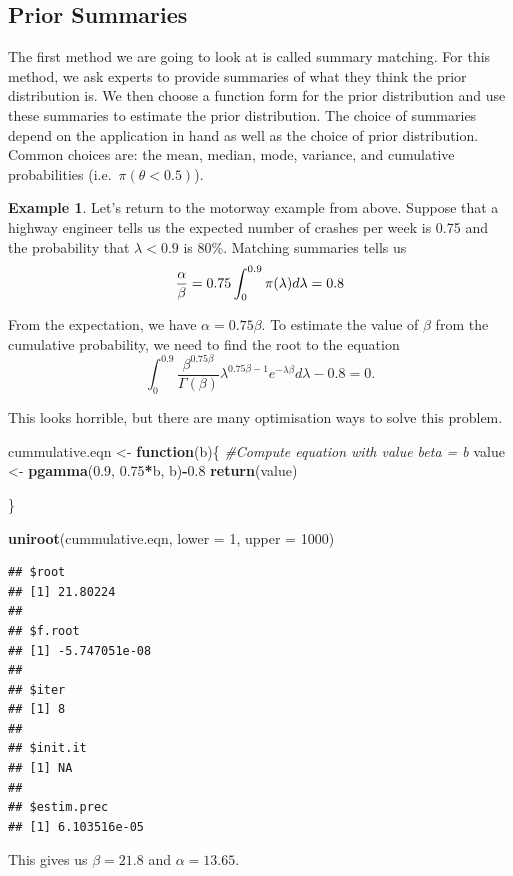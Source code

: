 \documentclass[
]{book}
\newenvironment{Shaded}{\begin{snugshade}}{\end{snugshade}}
\newcommand{\AttributeTok}[1]{\textcolor[rgb]{0.13,0.29,0.53}{#1}}
\newcommand{\CommentTok}[1]{\textcolor[rgb]{0.56,0.35,0.01}{\textit{#1}}}
\newcommand{\ControlFlowTok}[1]{\textcolor[rgb]{0.13,0.29,0.53}{\textbf{#1}}}
\newcommand{\DecValTok}[1]{\textcolor[rgb]{0.00,0.00,0.81}{#1}}
\newcommand{\FloatTok}[1]{\textcolor[rgb]{0.00,0.00,0.81}{#1}}
\newcommand{\FunctionTok}[1]{\textcolor[rgb]{0.13,0.29,0.53}{\textbf{#1}}}
\newcommand{\NormalTok}[1]{#1}
\newcommand{\OtherTok}[1]{\textcolor[rgb]{0.56,0.35,0.01}{#1}}
\newcommand{\SpecialCharTok}[1]{\textcolor[rgb]{0.81,0.36,0.00}{\textbf{#1}}}
\theoremstyle{definition}
\theoremstyle{definition}
\newtheorem{example}{Example}[chapter]
\theoremstyle{definition}
\theoremstyle{definition}
\theoremstyle{remark}
\begin{document}
\hypertarget{prior-summaries}{%
\subsection{Prior Summaries}\label{prior-summaries}}

The first method we are going to look at is called summary matching. For this method, we ask experts to provide summaries of what they think the prior distribution is. We then choose a function form for the prior distribution and use these summaries to estimate the prior distribution. The choice of summaries depend on the application in hand as well as the choice of prior distribution. Common choices are: the mean, median, mode, variance, and cumulative probabilities (i.e.~\(\pi(\theta < 0.5)\)).

\begin{example}
Let's return to the motorway example from above. Suppose that a highway engineer tells us the expected number of crashes per week is 0.75 and the probability that \(\lambda < 0.9\) is 80\%. Matching summaries tells us
\[
\frac{\alpha}{\beta} = 0.75 \\
\int_0^{0.9}\pi(\lambda) d\lambda = 0.8
\]

From the expectation, we have \(\alpha = 0.75\beta\). To estimate the value of \(\beta\) from the cumulative probability, we need to find the root to the equation
\[
\int_0^{0.9} \frac{\beta^{0.75\beta}}{\Gamma(\beta)}\lambda^{0.75\beta-1}e^{-\lambda\beta}d\lambda - 0.8 = 0. 
\]

This looks horrible, but there are many optimisation ways to solve this problem.

\begin{Shaded}
\begin{Highlighting}[]
\NormalTok{cummulative.eqn }\OtherTok{\textless{}{-}} \ControlFlowTok{function}\NormalTok{(b)\{}
  \CommentTok{\#Compute equation with value beta = b}
\NormalTok{  value }\OtherTok{\textless{}{-}} \FunctionTok{pgamma}\NormalTok{(}\FloatTok{0.9}\NormalTok{, }\FloatTok{0.75}\SpecialCharTok{*}\NormalTok{b, b)}\SpecialCharTok{{-}}\FloatTok{0.8}
  \FunctionTok{return}\NormalTok{(value)}
  
\NormalTok{\}}

\FunctionTok{uniroot}\NormalTok{(cummulative.eqn, }\AttributeTok{lower =} \DecValTok{1}\NormalTok{, }\AttributeTok{upper =} \DecValTok{1000}\NormalTok{)}
\end{Highlighting}
\end{Shaded}

\begin{verbatim}
## $root
## [1] 21.80224
## 
## $f.root
## [1] -5.747051e-08
## 
## $iter
## [1] 8
## 
## $init.it
## [1] NA
## 
## $estim.prec
## [1] 6.103516e-05
\end{verbatim}

This gives us \(\beta = 21.8\) and \(\alpha = 13.65\).
\end{example}
\end{document}
